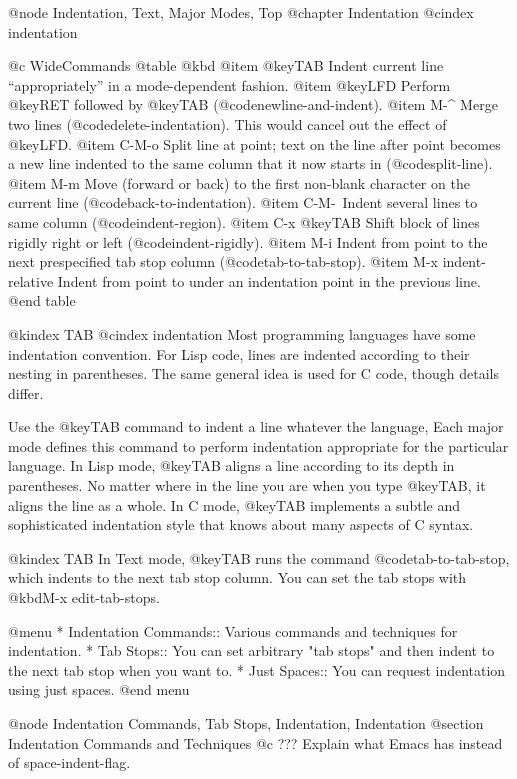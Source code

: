 {{{{{{{{{{{{{{{{{{@node Indentation, Text, Major Modes, Top
@chapter Indentation
@cindex indentation

@c WideCommands
@table @kbd
@item @key{TAB}
Indent current line ``appropriately'' in a mode-dependent fashion.
@item @key{LFD}
Perform @key{RET} followed by @key{TAB} (@code{newline-and-indent}).
@item M-^
Merge two lines (@code{delete-indentation}).  This would cancel out
the effect of @key{LFD}.
@item C-M-o
Split line at point; text on the line after point becomes a new line
indented to the same column that it now starts in (@code{split-line}).
@item M-m
Move (forward or back) to the first non-blank character on the current
line (@code{back-to-indentation}).
@item C-M-\
Indent several lines to same column (@code{indent-region}).
@item C-x @key{TAB}
Shift block of lines rigidly right or left (@code{indent-rigidly}).
@item M-i
Indent from point to the next prespecified tab stop column
(@code{tab-to-tab-stop}).
@item M-x indent-relative
Indent from point to under an indentation point in the previous line.
@end table

@kindex TAB
@cindex indentation
  Most programming languages have some indentation convention.  For Lisp
code, lines are indented according to their nesting in parentheses.  The
same general idea is used for C code, though details differ.

   Use the @key{TAB} command to indent a line whatever the language,
Each major mode defines this command to perform indentation appropriate
for the particular language.  In Lisp mode, @key{TAB} aligns a line
according to its depth in parentheses.  No matter where in the line you
are when you type @key{TAB}, it aligns the line as a whole.  In C mode,
@key{TAB} implements a subtle and sophisticated indentation style that
knows about many aspects of C syntax.

@kindex TAB
  In Text mode, @key{TAB} runs the command @code{tab-to-tab-stop}, which
indents to the next tab stop column.  You can set the tab stops with
@kbd{M-x edit-tab-stops}.

@menu
* Indentation Commands:: Various commands and techniques for indentation.
* Tab Stops::            You can set arbitrary "tab stops" and then
                         indent to the next tab stop when you want to.
* Just Spaces::          You can request indentation using just spaces.
@end menu

@node Indentation Commands, Tab Stops, Indentation, Indentation
@section Indentation Commands and Techniques
@c ??? Explain what Emacs has instead of space-indent-flag.

}}}}}}}}}}}}}}}}}}

